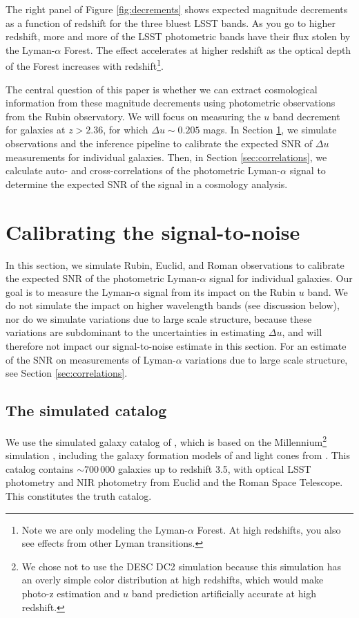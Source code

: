 \documentclass[twocolumn]{aastex631}
\newcommand{\lya}{Lyman-$\alpha$\xspace}
\newcommand{\du}{\Delta u}
\begin{document}
The right panel of Figure \ref{fig:decrements} shows expected magnitude decrements as a function of redshift for the three bluest LSST bands.
As you go to higher redshift, more and more of the LSST photometric bands have their flux stolen by the \lya Forest.
The effect accelerates at higher redshift as the optical depth of the Forest increases with redshift\footnote{Note we are only modeling the \lya Forest. At high redshifts, you also see effects from other Lyman transitions.}.

The central question of this paper is whether we can extract cosmological information from these magnitude decrements using photometric observations from the Rubin observatory.
We will focus on measuring the $u$ band decrement for galaxies at $z > 2.36$, for which $\Delta u \sim 0.205$ mags.
In Section \ref{sec:snr}, we simulate observations and the inference pipeline to calibrate the expected SNR of $\Delta u$ measurements for individual galaxies.
Then, in Section \ref{sec:correlations}, we calculate auto- and cross-correlations of the photometric \lya signal to determine the expected SNR of the signal in a cosmology analysis.


\section{Calibrating the signal-to-noise}
\label{sec:snr}

In this section, we simulate Rubin, Euclid, and Roman observations to calibrate the expected SNR of the photometric \lya signal for individual galaxies.
Our goal is to measure the \lya signal from its impact on the Rubin $u$ band.
We do not simulate the impact on higher wavelength bands (see discussion below), nor do we simulate variations due to large scale structure, because these variations are subdominant to the uncertainties in estimating $\du$, and will therefore not impact our signal-to-noise estimate in this section.
For an estimate of the SNR on measurements of \lya variations due to large scale structure, see Section \ref{sec:correlations}.

\subsection{The simulated catalog}
\label{sec:catalog}

We use the simulated galaxy catalog of \citet{graham2018, graham2020}, which is based on the Millennium\footnote{We chose not to use the DESC DC2 simulation \citep{dc2, cosmodc2} because this simulation has an overly simple color distribution at high redshifts, which would make photo-z estimation and $u$ band prediction artificially accurate at high redshift.} simulation \citep{millennium-sim}, including the galaxy formation models of \citep{gonzalez-perez2014} and light cones from \citep{merson2013}.
This catalog contains $\sim 700\,000$ galaxies up to redshift 3.5, with optical LSST photometry and NIR photometry from Euclid and the Roman Space Telescope.
This constitutes the truth catalog.
\end{document}
